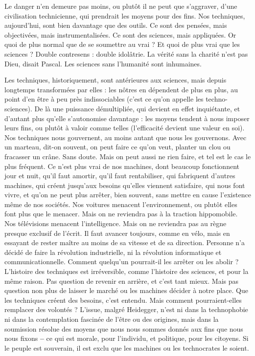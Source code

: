 Le danger n’en demeure pas moins, ou plutôt il ne peut que s’aggraver,
d’une civilisation technicienne, qui prendrait les moyens pour des fins. Nos
techniques, aujourd’hui, sont bien davantage que des outils. Ce sont des pensées,
mais objectivées, mais instrumentalisées. Ce sont des sciences, mais appliquées.
Or quoi de plus normal que de se soumettre au vrai ? Et quoi de plus
vrai que les sciences ? Double contresens : double idolâtrie. La vérité sans la
charité n’est pas Dieu, disait Pascal. Les sciences sans l'humanité sont inhumaines.

Les techniques, historiquement, sont antérieures aux sciences, mais depuis
longtemps transformées par elles : les nôtres en dépendent de plus en plus, au
point d’en être à peu près indissociables (c’est ce qu’on appelle les techno-sciences).
De là une puissance démultipliée, qui devient en effet inquiétante, et
d'autant plus qu’elle s’autonomise davantage : les moyens tendent à nous
imposer leurs fins, ou plutôt à valoir comme telles (l’efficacité devient une
valeur en soi). Nos techniques nous gouvernent, au moins autant que nous les
gouvernons. Avec un marteau, dit-on souvent, on peut faire ce qu’on veut,
planter un clou ou fracasser un crâne. Sans doute. Mais on peut aussi ne rien
faire, et tel est le cas le plus fréquent. Ce n’est plus vrai de nos machines, dont
beaucoup fonctionnent jour et nuit, qu’il faut amortir, qu’il faut rentabiliser,
qui fabriquent d’autres machines, qui créent jusqu'aux besoins qu’elles viennent
satisfaire, qui nous font vivre, et qu’on ne peut plus arrêter, bien souvent,
sans mettre en cause l’existence même de nos sociétés. Nos voitures menacent
l’environnement, ou plutôt elles font plus que le menacer. Mais on ne
reviendra pas à la traction hippomobile. Nos télévisions menacent l’intelligence.
Mais on ne reviendra pas au règne presque exclusif de l'écrit. Il faut
avancer toujours, comme en vélo, mais en essayant de rester maître au moins
de sa vitesse et de sa direction. Personne n’a décidé de faire la révolution industrielle,
ni la révolution informatique et communicationnelle. Comment
quelqu'un pourrait-il les arrêter ou les abolir ? L'histoire des techniques est irréversible,
comme l’histoire des sciences, et pour la même raison. Pas question de
revenir en arrière, et c’est tant mieux. Mais pas question non plus de laisser le
marché ou les machines décider à notre place. Que les techniques créent des
besoins, c’est entendu. Mais comment pourraient-elles remplacer des volontés ?
L'issue, malgré Heidegger, n’est ni dans la technophobie ni dans la contemplation
fascinée de l’être ou des origines, mais dans la soumission résolue des
moyens que nous nous sommes donnés aux fins que nous nous fixons {\bf --} ce qui
est morale, pour l'individu, et politique, pour les citoyens. Si le peuple est souverain,
il est exclu que les machines ou les technocrates le soient.

